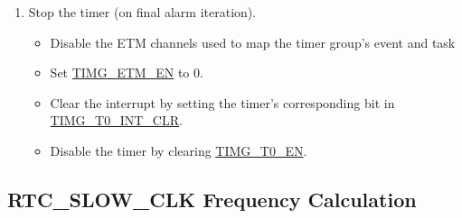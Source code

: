 \documentclass[main\_\_EN.tex]{subfiles}
\begin{document}
\begin{enumerate}
\begin{itemize}
        \item If \hyperref[fielddesc:TIMGTXAUTORELOAD]{TIMG\_T0\_AUTORELOAD} is 0, the current counter value is overwritten by the reloaded value because of the TIMER\_TASK\_CNT\_RELOAD\_TIMER0 (:0-1). The alarm generation will be reopened by TIMER\_TASK\_ALARM\_START\_TIMER0 (:0-1).
    \end{itemize}
    \item Stop the timer (on final alarm iteration).
    \begin{itemize}
        \item Disable the ETM channels used to map the timer group's event and task
        \item Set \hyperref[fielddesc:TIMGETMEN]{TIMG\_ETM\_EN} to 0.
        \item Clear the interrupt by setting the timer's corresponding bit in \hyperref[fielddesc:TIMGT0INTCLR]{TIMG\_T0\_INT\_CLR}.
        \item Disable the timer by clearing \hyperref[fielddesc:TIMGTXEN]{TIMG\_T0\_EN}.
    \end{itemize}
\end{enumerate}

\subsection{RTC\_SLOW\_CLK Frequency Calculation}\label{sec:rtc-calibration-procedure}
\end{document}

